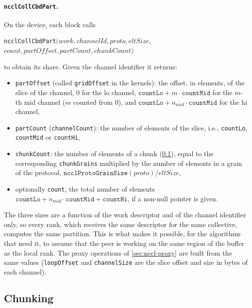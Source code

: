 \paragraph{\texttt{ncclCollCbdPart}.}
On the device, each block calls
\begin{center}\small
\texttt{ncclCollCbdPart}$(\mathit{work},\mathit{channelId},\mathit{proto},\mathit{eltSize},$\\
$\mathit{count},\mathit{partOffset},\mathit{partCount},\mathit{chunkCount})$
\end{center}
to obtain its share.
Given the channel identifier it returns:
\begin{itemize}
  \item \texttt{partOffset} (called \texttt{gridOffset} in the kernels): the offset, in elements, of the slice of the channel, $0$ for the lo channel, $\texttt{countLo}+m\cdot\texttt{countMid}$ for the $m$-th mid channel ($m$ counted from $0$), and $\texttt{countLo}+n_{mid}\cdot\texttt{countMid}$ for the hi channel,
  \item \texttt{partCount} (\texttt{channelCount}): the number of elements of the slice, i.e., \texttt{countLo}, \texttt{countMid} or \texttt{countHi},
  \item \texttt{chunkCount}: the number of elements of a chunk (\cref{sec:nccl-chunks}), equal to the corresponding \texttt{chunkGrains} multiplied by the number of elements in a grain of the protocol, $\texttt{ncclProtoGrainSize}(\mathit{proto})/\mathit{eltSize}$,
  \item optionally \texttt{count}, the total number of elements $\texttt{countLo}+n_{mid}\cdot\texttt{countMid}+\texttt{countHi}$, if a non-null pointer is given.
\end{itemize}
The three sizes are a function of the work descriptor and of the channel identifier only, so every rank, which receives the same descriptor for the same collective, computes the same partition.
This is what makes it possible, for the algorithms that need it, to assume that the peer is working on the same region of the buffer as the local rank.
The proxy operations of \cref{sec:nccl-proxy} are built from the same values (\texttt{loopOffset} and \texttt{channelSize} are the slice offset and size in bytes of each channel).

\subsection{Chunking}\label{sec:nccl-chunks}

